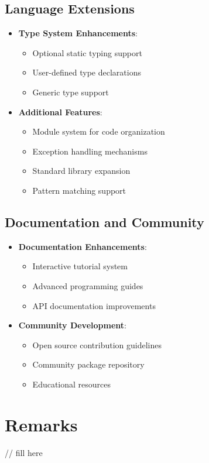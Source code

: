 \documentclass[conference]{IEEEtran}
\begin{document}
\subsection{Language Extensions}
\begin{itemize}
    \item \textbf{Type System Enhancements}:
    \begin{itemize}
        \item Optional static typing support
        \item User-defined type declarations
        \item Generic type support
    \end{itemize}
    
    \item \textbf{Additional Features}:
    \begin{itemize}
        \item Module system for code organization
        \item Exception handling mechanisms
        \item Standard library expansion
        \item Pattern matching support
    \end{itemize}
\end{itemize}

\subsection{Documentation and Community}
\begin{itemize}
    \item \textbf{Documentation Enhancements}:
    \begin{itemize}
        \item Interactive tutorial system
        \item Advanced programming guides
        \item API documentation improvements
    \end{itemize}
    
    \item \textbf{Community Development}:
    \begin{itemize}
        \item Open source contribution guidelines
        \item Community package repository
        \item Educational resources
    \end{itemize}
\end{itemize}

\section{Remarks}
// fill here
\end{document}
